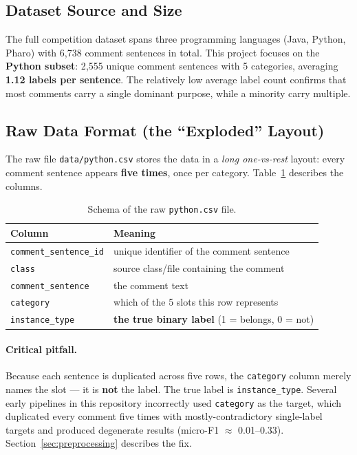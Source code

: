 \documentclass[11pt,a4paper]{article}
\begin{document}
\subsection{Dataset Source and Size}

The full competition dataset spans three programming languages (Java, Python,
Pharo) with 6{,}738 comment sentences in total. This project focuses on the
\textbf{Python subset}: 2{,}555 unique comment sentences with 5 categories,
averaging \textbf{1.12 labels per sentence}. The relatively low average label
count confirms that most comments carry a single dominant purpose, while a
minority carry multiple.

\subsection{Raw Data Format (the ``Exploded'' Layout)}

The raw file \texttt{data/python.csv} stores the data in a \emph{long
one-vs-rest} layout: every comment sentence appears \textbf{five times}, once per
category. Table~\ref{tab:rawschema} describes the columns.

\begin{table}[H]
\centering
\caption{Schema of the raw \texttt{python.csv} file.}
\label{tab:rawschema}
\begin{tabular}{ll}
\toprule
\textbf{Column} & \textbf{Meaning} \\
\midrule
\texttt{comment\_sentence\_id} & unique identifier of the comment sentence \\
\texttt{class}                & source class/file containing the comment \\
\texttt{comment\_sentence}     & the comment text \\
\texttt{category}              & which of the 5 slots this row represents \\
\texttt{instance\_type}        & \textbf{the true binary label} (1 = belongs, 0 = not) \\
\bottomrule
\end{tabular}
\end{table}

\paragraph{Critical pitfall.}
Because each sentence is duplicated across five rows, the \texttt{category}
column merely names the slot --- it is \textbf{not} the label. The true label is
\texttt{instance\_type}. Several early pipelines in this repository incorrectly
used \texttt{category} as the target, which duplicated every comment five times
with mostly-contradictory single-label targets and produced degenerate results
(micro-F1 $\approx$ 0.01--0.33). Section~\ref{sec:preprocessing} describes the
fix.
\end{document}
